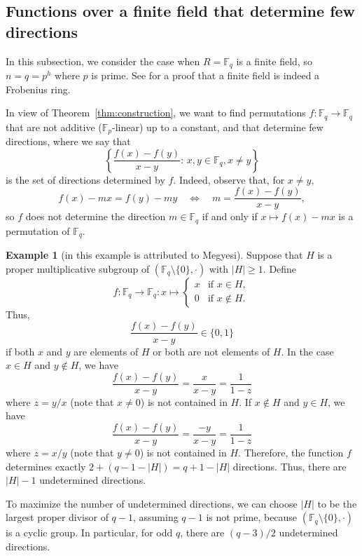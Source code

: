 \documentclass[a4paper]{article}
\theoremstyle{definition}
\newtheorem{example}[theorem]{Example}
\newcommand{\FF}{\mathbb F}
\begin{document}
\subsection{Functions over a finite field that determine few directions}

In this subsection, we consider the case when \(R=\FF_q\) is a finite field, so \(n=q=p^h\) where \(p\) is prime. See \cite{Frobenius} for a proof that a finite field is indeed a Frobenius ring.

In view of Theorem~\ref{thm:construction}, we want to find permutations \(f:\FF_q\to\FF_q\) that are not additive (\(\FF_p\)-linear) up to a constant, and that determine few directions, where we say that \[\left\{\frac{f(x)-f(y)}{x-y}\colon\,x,y\in\FF_q, x\neq y\right\}\] is the set of directions determined by \(f\). Indeed, observe that, for \(x\neq y\), 
\[f(x)-mx=f(y)-my\quad\Longleftrightarrow\quad m=\frac{f(x)-f(y)}{x-y},\]
so \(f\) does not determine the direction \(m\in\FF_q\) if and only if \(x\mapsto f(x)-mx\) is a permutation of \(\FF_q\).

\begin{example}[in \cite{BBS} this example is attributed to Megyesi]\label{ex:f2}
    Suppose that \(H\) is a proper multiplicative subgroup of \((\FF_q\setminus\{0\},\cdot)\) with \(|H|\geq1\). Define \[f:\FF_q\to\FF_q:x\mapsto\begin{cases}x&\text{if }x\in H,\\0&\text{if }x\notin H.\end{cases}\]
    Thus,
    \[\frac{f(x)-f(y)}{x-y} \in \{0,1\}\]
    if both \(x\) and \(y\) are elements of \(H\) or both are not elements of \(H\). In the case \(x\in H\) and \(y\notin H\), we have
    \[\frac{f(x)-f(y)}{x-y}=\frac{x}{x-y}=\frac{1}{1-z}\]
    where \(z=y/x\) (note that \(x\neq0\)) is not contained in \(H\). If \(x\notin H\) and \(y\in H\), we have
    \[\frac{f(x)-f(y)}{x-y}=\frac{-y}{x-y}=\frac{1}{1-z}\]
    where \(z=x/y\) (note that \(y\neq0\)) is not contained in \(H\). Therefore, the function $f$ determines exactly \(2+(q-1-|H|)=q+1-|H|\) directions. Thus, there are \(|H|-1\) undetermined directions.
\end{example}

To maximize the number of undetermined directions, we can choose \(|H|\) to be the largest proper divisor of \(q-1\), assuming \(q-1\) is not prime, because \((\FF_q\setminus\{0\},\cdot)\) is a cyclic group. In particular, for odd \(q\), there are $(q-3)/2$ undetermined directions.
\end{document}
